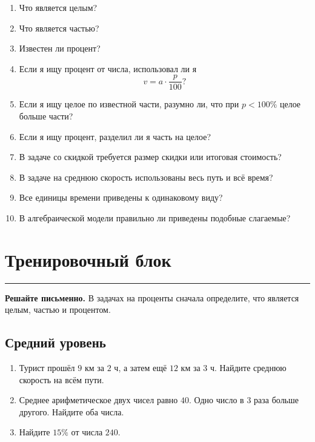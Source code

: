 \documentclass[a4paper,12pt]{article}
\newcommand{\sectionrule}{%
  \par
  \vspace{-0.35em}
  {\color{accent}\rule{\linewidth}{0.7pt}}
  \vspace{0.55em}
}
\begin{document}
\begin{enumerate}

  \item
  Что является целым?

  \item
  Что является частью?

  \item
  Известен ли процент?

  \item
  Если я ищу процент от числа,
  использовал ли я
  \[
  v=a\cdot\frac{p}{100}?
  \]

  \item
  Если я ищу целое по известной части,
  разумно ли, что при $p<100\%$ целое больше части?

  \item
  Если я ищу процент,
  разделил ли я часть на целое?

  \item
  В задаче со скидкой требуется размер скидки
  или итоговая стоимость?

  \item
  В задаче на среднюю скорость использованы
  весь путь и всё время?

  \item
  Все единицы времени приведены к одинаковому виду?

  \item
  В алгебраической модели правильно ли приведены подобные слагаемые?

\end{enumerate}


\clearpage

\section*{Тренировочный блок}
\sectionrule

\textbf{Решайте письменно.}
В задачах на проценты сначала определите,
что является целым, частью и процентом.

\subsection*{Средний уровень}

\begin{enumerate}[label=\arabic*)]

  \item
  Турист прошёл $9$ км за $2$ ч,
  а затем ещё $12$ км за $3$ ч.
  Найдите среднюю скорость на всём пути.

  \item
  Среднее арифметическое двух чисел равно $40$.
  Одно число в $3$ раза больше другого.
  Найдите оба числа.

  \item
  Найдите $15\%$ от числа $240$.

\end{enumerate}
\end{document}
